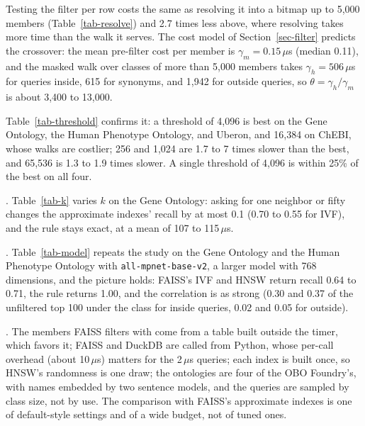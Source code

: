 

\noindent
Testing the filter per row costs the same as resolving it into a bitmap up to 5,000
members (Table~\ref{tab-resolve}) and 2.7 times less above, where resolving takes more
time than the walk it serves.
The cost model of Section~\ref{sec-filter} predicts the crossover: the mean pre-filter
cost per member is $\gamma_m=0.15\,\mu$s (median 0.11), and the masked walk over classes of
more than 5,000 members takes $\gamma_h=506\,\mu$s for queries inside, 615 for synonyms, and
1,942 for outside queries, so $\theta=\gamma_h/\gamma_m$ is about 3,400 to 13,000.





\noindent
Table~\ref{tab-threshold} confirms it: a threshold of 4,096 is best on the Gene Ontology,
the Human Phenotype Ontology, and Uberon, and 16,384 on ChEBI, whose walks are costlier;
256 and 1,024 are 1.7 to 7 times slower than the best, and 65,536 is 1.3 to 1.9 times
slower.
A single threshold of 4,096 is within 25\% of the best on all four.

.
Table~\ref{tab-k} varies $k$ on the Gene Ontology: asking for one neighbor or fifty changes
the approximate indexes' recall by at most 0.1 (0.70 to 0.55 for IVF), and the rule stays
exact, at a mean of 107 to 115\,$\mu$s.



.
Table~\ref{tab-model} repeats the study on the Gene Ontology and the Human Phenotype
Ontology with \texttt{all-mpnet-base-v2}, a larger model with 768 dimensions, and the picture
holds: FAISS's IVF and HNSW return recall 0.64 to 0.71, the rule returns 1.00, and the
correlation is as strong (0.30 and 0.37 of the unfiltered top 100 under the class for inside
queries, 0.02 and 0.05 for outside).

.
The members FAISS filters with come from a table built outside the timer, which favors it;
FAISS and DuckDB are called from Python, whose per-call overhead (about 10\,$\mu$s) matters
for the 2\,$\mu$s queries; each index is built once, so HNSW's randomness is one draw;
the ontologies are four of the OBO Foundry's, with names embedded by two sentence models,
and the queries are sampled by class size, not by use.
The comparison with FAISS's approximate indexes is one of default-style settings and of a
wide budget, not of tuned ones.

